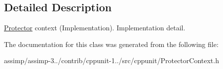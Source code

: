 \subsection{Detailed Description}
\hyperlink{class_protector}{Protector} context (Implementation). Implementation detail. 

The documentation for this class was generated from the following file\+:\begin{DoxyCompactItemize}
\item 
assimp/assimp-\/3../contrib/cppunit-\/1../src/cppunit/Protector\+Context.\+h\end{DoxyCompactItemize}
